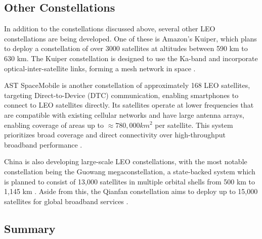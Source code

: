 \FloatBarrier
\subsection{Other Constellations}
In addition to the constellations discussed above, several other LEO constellations are being developed. One of these is Amazon's Kuiper, which plans to deploy a constellation of over 3000 satellites at altitudes between 590 km to 630 km. The Kuiper constellation is designed to use the Ka-band and incorporate optical-inter-satellite links, forming a mesh network in space \cite{amazon_leo_2026}. 

AST SpaceMobile is another constellation of approximately 168 LEO satellites, targeting Direct-to-Device (DTC) communication, enabling smartphones to connect to LEO satellites directly. Its satellites operate at lower frequencies that are compatible with existing cellular networks and have large antenna arrays, enabling coverage of areas up to $\approx 780,000 km^2$ per satellite. This system prioritizes broad coverage and direct connectivity over high-throughput broadband performance \cite{ast_spacemobile_vs_starlink_2023}.

China is also developing large-scale LEO constellations, with the most notable constellation being the Guowang megaconstellation, a state-backed system which is planned to consist of 13,000 satellites in multiple orbital shells from 500 km to 1,145 km \cite{guowang_constellation_2024}. Aside from this, the Qianfan constellation aims to deploy up to 15,000 satellites for global broadband services \cite{china_satellite_internet_race_2026}. 


\FloatBarrier
\subsection{Summary}
\FloatBarrier
\begin{center}
\label{tab:leo-constellations}
\label{tab:summary}
\end{center}

